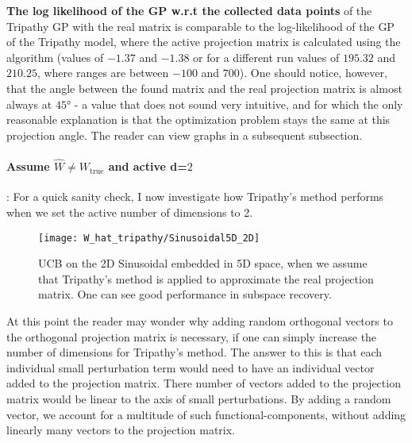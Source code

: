 
\textbf{The log likelihood of the GP w.r.t the collected data points} of the Tripathy GP with the real matrix is comparable to the log-likelihood of the GP of the Tripathy model, where the active projection matrix is calculated using the algorithm (values of $-1.37$ and $-1.38$ or for a different run values of $195.32$ and $210.25$, where ranges are between  $-100$ and $700$).
One should notice, however, that the angle between the found matrix and the real projection matrix is almost always at $45°$ - a value that does not sound very intuitive, and for which the only reasonable explanation is that the optimization problem stays the same at this projection angle.
The reader can view graphs in a subsequent subsection.

\paragraph{Assume $\hat{W} \neq W_{\text{true}}$ and active d=$2$ }: For a quick sanity check, I now investigate how Tripathy's method performs when we set the active number of dimensions to 2.

\begin{figure}[H]
  \centering
      \texttt{[image: W\_hat\_tripathy/Sinusoidal5D\_2D]}
  \caption{UCB on the 2D Sinusoidal embedded in 5D space, when we assume that Tripathy's method is applied to approximate the real projection matrix.
  One can see good performance in subspace recovery.}
\end{figure}

At this point the reader may wonder why adding random orthogonal vectors to the orthogonal projection matrix is necessary, if one can simply increase the number of dimensions for Tripathy's method.
The answer to this is that each individual small perturbation term would need to have an individual vector added to the projection matrix.
There number of vectors added to the projection matrix would be linear to the axis of small perturbations.
By adding a random vector, we account for a multitude of such functional-components, without adding linearly many vectors to the projection matrix.


